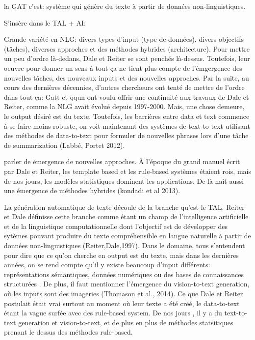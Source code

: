la GAT c'est: système qui génère du texte à partir de données non-linguistiques.

S'insère dans le TAL + AI: 

Grande variété en NLG: divers types d'input (type de données), divers objectifs (tâches), diverses approches et des méthodes hybrides (architecture). Pour mettre un peu d'ordre là-dedans, Dale et Reiter se sont penchés là-dessus. Toutefois, leur oeuvre pour donner un sens à tout ça ne tient plus compte de l'émgergence des nouvelles tâches, des nouveaux inputs et des nouvelles approches. Par la suite, au cours des dernières décennies, d'autres chercheurs ont tenté de mettre de l'ordre dans tout ça:  Gatt et qqun ont voulu offrir une continuité aux travaux de Dale et Reiter, comme la NLG avait évolué depuis 1997-2000. Mais, une chose demeure, le output désiré est du texte. Toutefois, les barrières entre data et text commence à se faire moins robuste, on voit maintenant des systèmes de text-to-text utilisant des méthodes de data-to-text pour formuler de nouvelles phrases lors d'une tâche de summarization (Labbé, Portet 2012).

parler de émergence de nouvelles approches. À l'époque du grand manuel écrit par Dale et Reiter, les template based et les rule-based systèmes étaient rois, mais de nos jours, les modèles statistiques dominent les applications. De là naît aussi une émergence de méthodes hybrides (kondadi et al 2013).

La génération automatique de texte découle de la branche qu'est le TAL. Reiter et Dale définisse cette branche comme étant un champ de l'intelligence artificielle et de la linguistique computationnelle dont l'objectif est de développer des sytèmes pouvant produire du texte compréhensible en langue naturelle à partir de données non-linguistiques (Reiter,Dale,1997). Dans le domaine, tous s'entendent pour dire que ce qu'on cherche en output est du texte, mais dans les dernières années, on se rend compte qu'il y existe beaucoup d'input différents: représentations sémantiques, données numériques ou des bases de connaissances structurées \citep{gatt18}. De plus, il faut mentionner l'émergence du vision-to-text generation, où les inputs sont des imageries (Thomason et al., 2014). Ce que Dale et Reiter postulait était vrai surtout au moment où leur texte a été créé, le data-to-text étant la vague surfée avec des rule-based system. De nos jours , il y a du text-to-text generation et vision-to-text, et de plus en plus de méthodes statsitiques prenant le dessus des méthodes rule-based. 

